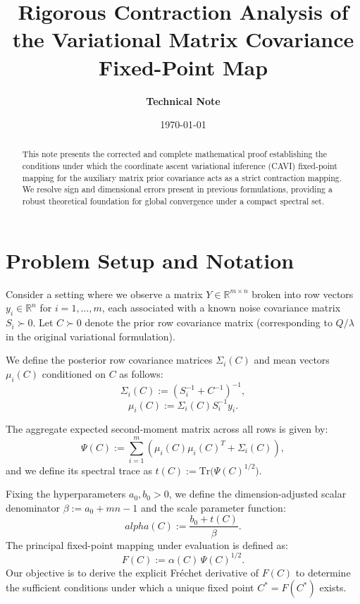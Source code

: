 \documentclass[11pt,a4paper]{article}
\title{\textbf{Rigorous Contraction Analysis of the Variational Matrix Covariance Fixed-Point Map}}
\author{\textbf{Technical Note}}
\date{\today}
\begin{document}
\maketitle

\begin{abstract}
This note presents the corrected and complete mathematical proof establishing the conditions under which the coordinate ascent variational inference (CAVI) fixed-point mapping for the auxiliary matrix prior covariance acts as a strict contraction mapping. We resolve sign and dimensional errors present in previous formulations, providing a robust theoretical foundation for global convergence under a compact spectral set.
\end{abstract}

\section{Problem Setup and Notation}

Consider a setting where we observe a matrix $Y \in \mathbb{R}^{m \times n}$ broken into row vectors $y_i \in \mathbb{R}^n$ for $i=1,\dots,m$, each associated with a known noise covariance matrix $S_i \succ 0$. Let $C \succ 0$ denote the prior row covariance matrix (corresponding to $Q/\lambda$ in the original variational formulation). 

We define the posterior row covariance matrices $\Sigma_i(C)$ and mean vectors $\mu_i(C)$ conditioned on $C$ as follows:
\begin{equation}
\Sigma_i(C) := \left(S_i^{-1} + C^{-1}\right)^{-1},
\end{equation}
\begin{equation}
\mu_i(C) := \Sigma_i(C) S_i^{-1} y_i.
\end{equation}

The aggregate expected second-moment matrix across all rows is given by:
\begin{equation}
\Psi(C) := \sum_{i=1}^m \left( \mu_i(C)\mu_i(C)^T + \Sigma_i(C)\right),
\end{equation}
and we define its spectral trace as $t(C) := \text{Tr}\big(\Psi(C)^{1/2}\big)$.

Fixing the hyperparameters $a_0, b_0 > 0$, we define the dimension-adjusted scalar denominator $\beta := a_0 + mn - 1$ and the scale parameter function:
\begin{equation}
alpha(C) := \frac{b_0 + t(C)}{\beta}.
\end{equation}
The principal fixed-point mapping under evaluation is defined as:
\begin{equation}\label{eq:F-def}
F(C) := \alpha(C)\,\Psi(C)^{1/2}.
\end{equation}
Our objective is to derive the explicit Fr\'echet derivative of $F(C)$ to determine the sufficient conditions under which a unique fixed point $C^* = F(C^*)$ exists.
\end{document}
